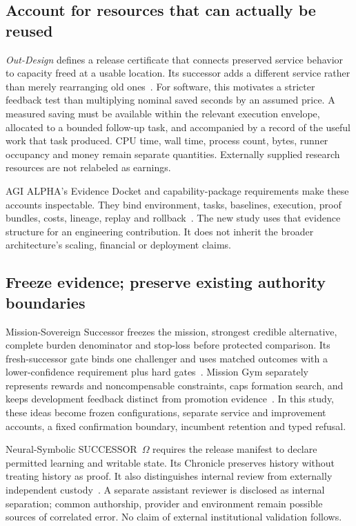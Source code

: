 \subsection{Account for resources that can actually be reused}

\emph{Out-Design} defines a release certificate that connects preserved service behavior to capacity freed at a usable location. Its successor adds a different service rather than merely rearranging old ones~\cite[PDF pp.~5, 12--13]{out_design}. For software, this motivates a stricter feedback test than multiplying nominal saved seconds by an assumed price. A measured saving must be available within the relevant execution envelope, allocated to a bounded follow-up task, and accompanied by a record of the useful work that task produced. CPU time, wall time, process count, bytes, runner occupancy and money remain separate quantities. Externally supplied research resources are not relabeled as earnings.

AGI ALPHA's Evidence Docket and capability-package requirements make these accounts inspectable. They bind environment, tasks, baselines, execution, proof bundles, costs, lineage, replay and rollback~\cite[PDF pp.~37, 60, 69]{agi_alpha}. The new study uses that evidence structure for an engineering contribution. It does not inherit the broader architecture's scaling, financial or deployment claims.

\subsection{Freeze evidence; preserve existing authority boundaries}

Mission-Sovereign Successor freezes the mission, strongest credible alternative, complete burden denominator and stop-loss before protected comparison. Its fresh-successor gate binds one challenger and uses matched outcomes with a lower-confidence requirement plus hard gates~\cite[PDF pp.~32, 41]{mission_sovereign}. Mission Gym separately represents rewards and noncompensable constraints, caps formation search, and keeps development feedback distinct from promotion evidence~\cite[PDF pp.~19, 38, 40, 48]{gym_specialist}. In this study, these ideas become frozen configurations, separate service and improvement accounts, a fixed confirmation boundary, incumbent retention and typed refusal.

Neural-Symbolic SUCCESSOR~$\Omega$ requires the release manifest to declare permitted learning and writable state. Its Chronicle preserves history without treating history as proof. It also distinguishes internal review from externally independent custody~\cite[PDF pp.~17, 26--28, 30]{neural_symbolic_v1}. A separate assistant reviewer is disclosed as internal separation; common authorship, provider and environment remain possible sources of correlated error. No claim of external institutional validation follows.

